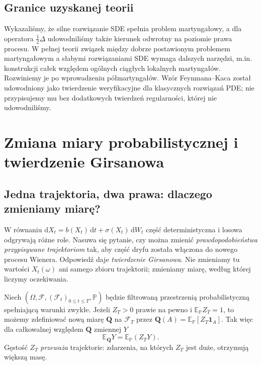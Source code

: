 \documentclass[11pt,a4paper,oneside]{report}
\numberwithin{equation}{chapter}
\theoremstyle{plain}
\theoremstyle{definition}
\theoremstyle{remark}
\newcommand{\Prob}{\mathbb{P}}
\newcommand{\E}{\mathbb{E}}
\newcommand{\calF}{\mathcal{F}}
\newcommand{\ind}[1]{\mathbf{1}_{#1}}
\newcommand{\dd}{\mathrm{d}}
\begin{document}
\section{Granice uzyskanej teorii}\label{sec:volIII:07:06}
Wykazaliśmy, że silne rozwiązanie SDE spełnia problem martyngałowy,
a dla operatora $\frac12\Delta$ udowodniliśmy także kierunek odwrotny
na poziomie prawa procesu. W pełnej teorii związek między dobrze
postawionym problemem martyngałowym a słabymi rozwiązaniami SDE
wymaga dalszych narzędzi, m.in. konstrukcji całek względem ogólnych
ciągłych lokalnych martyngałów. Rozwiniemy je po wprowadzeniu
półmartyngałów. Wzór Feynmana--Kaca został udowodniony jako
twierdzenie weryfikacyjne dla klasycznych rozwiązań PDE;
nie przypisujemy mu bez dodatkowych twierdzeń regularności,
której nie udowodniliśmy.


\chapter{Zmiana miary probabilistycznej i twierdzenie Girsanowa}
\label{chap:volIII:08}
\par\smallskip{}\par\smallskip

\label{ch:girsanov}

\section{Jedna trajektoria, dwa prawa: dlaczego zmieniamy miarę?}\label{sec:volIII:08:01}

W równaniu $\dd X_t=b(X_t)\,\dd t+\sigma(X_t)\,\dd W_t$
część deterministyczna i losowa odgrywają różne role.
Nasuwa się pytanie, czy można zmienić \emph{prawdopodobieństwa
przypisywane trajektoriom} tak, aby część dryfu została
włączona do nowego procesu Wienera. Odpowiedź daje
\emph{twierdzenie Girsanowa}. Nie zmieniamy tu wartości $X_t(\omega)$
ani samego zbioru trajektorii; zmieniamy miarę, według której
liczymy oczekiwania.

Niech $(\Omega,\calF,(\calF_t)_{0\le t\le T},\Prob)$
będzie filtrowaną przestrzenią probabilistyczną spełniającą
warunki zwykłe. Jeżeli $Z_T>0$ prawie na pewno i
$\E_{\Prob}Z_T=1$, to możemy zdefiniować nową miarę
$\mathbf Q$ na $\calF_T$ przez
$\mathbf Q(A)=\E_{\Prob}[Z_T\ind A]$.
Tak więc dla całkowalnej względem $\mathbf Q$ zmiennej $Y$
\[
\E_{\mathbf Q}Y=\E_{\Prob}(Z_TY).
\]
Gęstość $Z_T$ \emph{przeważa} trajektorie: zdarzenia,
na których $Z_T$ jest duże, otrzymują większą masę.
\end{document}
